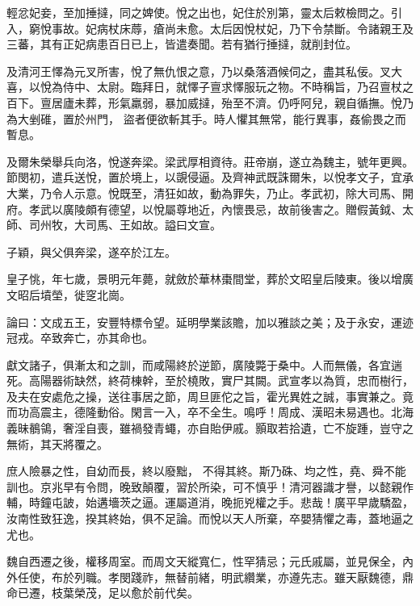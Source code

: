 \begin{pinyinscope}
 輕忿妃妾，至加捶撻，同之婢使。悅之出也，妃住於別第，靈太后敕檢問之。引入，窮悅事故。妃病杖床蓐，瘡尚未愈。太后因悅杖妃，乃下令禁斷。令諸親王及三蕃，其有正妃病患百日已上，皆遣奏聞。若有猶行捶撻，就削封位。



 及清河王懌為元叉所害，悅了無仇恨之意，乃以桑落酒候伺之，盡其私佞。叉大喜，以悅為侍中、太尉。臨拜日，就懌子亶求懌服玩之物。不時稱旨，乃召亶杖之百下。亶居廬未葬，形氣羸弱，暴加威撻，殆至不濟。仍呼阿兒，親自循撫。悅乃為大剉碓，置於州門，
 盜者便欲斬其手。時人懼其無常，能行異事，姦偷畏之而暫息。



 及爾朱榮舉兵向洛，悅遂奔梁。梁武厚相資待。莊帝崩，遂立為魏主，號年更興。節閔初，遣兵送悅，置於境上，以覬侵逼。及齊神武既誅爾朱，以悅孝文子，宜承大業，乃令人示意。悅既至，清狂如故，動為罪失，乃止。孝武初，除大司馬、開府。孝武以廣陵頗有德望，以悅屬尊地近，內懷畏忌，故前後害之。贈假黃鉞、太師、司州牧，大司馬、王如故。謚曰文宣。



 子穎，與父俱奔梁，遂卒於江左。



 皇子恌，年七歲，景明元年薨，就斂於華林棗間堂，葬於文昭皇后陵東。後以增廣文昭后墳塋，徙窆北崗。



 論曰：文成五王，安豐特標令望。延明學業該贍，加以雅談之美；及于永安，運迹冠戎。卒致奔亡，亦其命也。



 獻文諸子，俱漸太和之訓，而咸陽終於逆節，廣陵斃于桑中。人而無儀，各宜遄死。高陽器術缺然，終荷棟幹，至於橈敗，實尸其闕。武宣孝以為質，忠而樹行，及夫在安處危之操，送往事居之節，周旦匪佗之旨，霍光異姓之誠，事實兼之。竟而功高震主，德隆動俗。閑言一入，卒不全生。鳴呼！周成、漢昭未易遇也。北海義昧鶺鴒，奢淫自喪，雖禍發青蠅，亦自貽伊戚。顥取若拾遺，亡不旋踵，豈守之無術，其天將覆之。



 庶人險暴之性，自幼而長，終以廢黜，
 不得其終。斯乃硃、均之性，堯、舜不能訓也。京兆早有令問，晚致顛覆，習於所染，可不慎乎！清河器識才譽，以懿親作輔，時鐘屯詖，始遘墻茨之逼。運屬道消，晚扼兇權之手。悲哉！廣平早歲驕盈，汝南性致狂逸，揆其終始，俱不足論。而悅以天人所棄，卒嬰猜懼之毒，蓋地逼之尤也。



 魏自西遷之後，權移周室。而周文天縱寬仁，性罕猜忌；元氏戚屬，並見保全，內外任使，布於列職。孝閔踐祚，無替前緒，明武纘業，亦遵先志。雖天厭魏德，鼎命已遷，枝葉榮茂，足以愈於前代矣。



\end{pinyinscope}